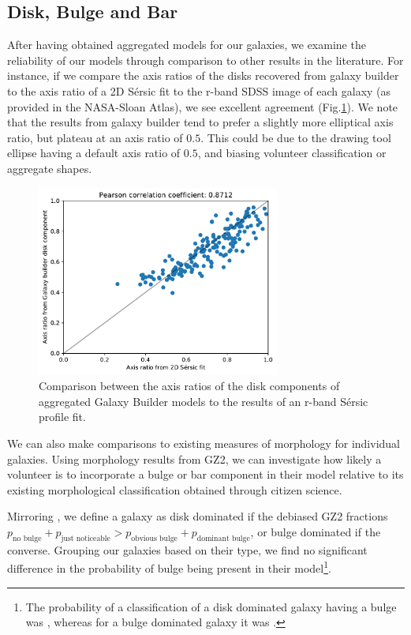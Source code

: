 \documentclass[../main.tex]{subfiles}
\begin{document}
\subsection{Disk, Bulge and Bar}

After having obtained aggregated models for our galaxies, we examine the reliability of our models through comparison to other results in the literature. For instance, if we compare the axis ratios of the disks recovered from galaxy builder to the axis ratio of a 2D S\'ersic fit to the r-band SDSS image of each galaxy (as provided in the NASA-Sloan Atlas), we see excellent agreement (Fig.\ref{fig:ax_ratio_comparison}). We note that the results from galaxy builder tend to prefer a slightly more elliptical axis ratio, but plateau at an axis ratio of $0.5$. This could be due to the drawing tool ellipse having a default axis ratio of $0.5$, and biasing volunteer classification or aggregate shapes.

\begin{figure}
  \includegraphics[width=8cm]{images__results/GZBvsNSA_ax-ratio_SERSIC_BA.pdf}
  \caption{Comparison between the axis ratios of the disk components of aggregated Galaxy Builder models to the results of an r-band S\'ersic profile fit.}
  \label{fig:ax_ratio_comparison}
\end{figure}

We can also make comparisons to existing measures of morphology for individual galaxies. Using morphology results from GZ2, we can investigate how likely a volunteer is to incorporate a bulge or bar component in their model relative to its existing morphological classification obtained through citizen science.

Mirroring \citet{Kruk2017:1710.00093v2}, we define a galaxy as disk dominated if the debiased GZ2 fractions $p_\text{no bulge} + p_\text{just noticeable} > p_\text{obvious bulge} + p_\text{dominant bulge}$, or bulge dominated if the converse. Grouping our galaxies based on their type, we find no significant difference in the probability of bulge being present in their model\footnote{The probability of a classification of a disk dominated galaxy having a bulge was , whereas for a bulge dominated galaxy it was .}.
\end{document}
